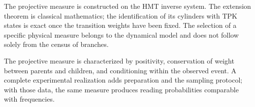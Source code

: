 \begin{statusbox}
The projective measure is constructed on the HMT inverse system.
The extension theorem is classical mathematics; the identification of its
cylinders with TPK states is exact once the transition weights have been fixed.
The selection of a specific physical measure belongs to the dynamical model and does not
follow solely from the census of branches.
\end{statusbox}

The projective measure is characterized by positivity, conservation of
weight between parents and children, and conditioning within the observed event. A
complete experimental realization adds preparation and the sampling
protocol; with those data, the same measure produces reading probabilities
comparable with frequencies.

